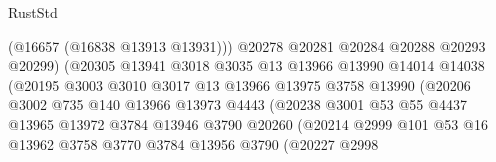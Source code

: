 \begin{lexlean}{RustStd}
\begin{coremodule}
                                      (@16657 (@16838 @13913 @13931)))
                                    @20278
                                    @20281
                                    @20284
                                    @20288
                                    @20293
                                    @20299)
                                  (@20305
                                    @13941
                                    @3018
                                    @3035
                                    @13
                                    @13966
                                    @13990
                                    @14014
                                    @14038
                                    (@20195
                                      @3003
                                      @3010
                                      @3017
                                      @13
                                      @13966
                                      @13975
                                      @3758
                                      @13990
                                      (@20206
                                        @3002
                                        @735
                                        @140
                                        @13966
                                        @13973
                                        @4443
                                        (@20238
                                          @3001
                                          @53
                                          @55
                                          @4437
                                          @13965
                                          @13972
                                          @3784
                                          @13946
                                          @3790
                                          @20260
                                          (@20214
                                            @2999
                                            @101
                                            @53
                                            @16
                                            @13962
                                            @3758
                                            @3770
                                            @3784
                                            @13956
                                            @3790
                                            (@20227
                                              @2998

\end{coremodule}
\end{lexlean}
